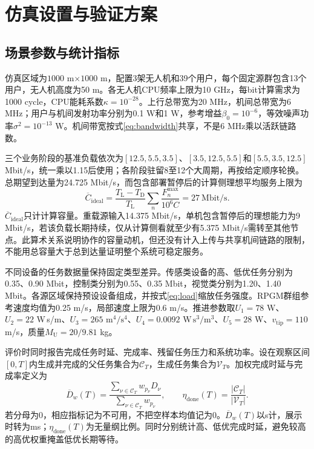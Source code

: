 \section{仿真设置与验证方案}
\subsection{场景参数与统计指标}
仿真区域为$1000$ m$\times1000$ m，配置3架无人机和39个用户，每个固定源群包含13个用户，无人机高度为50 m。各无人机CPU频率上限为10 GHz，每bit计算需求为1000 cycle，CPU能耗系数$\kappa=10^{-28}$。上行总带宽为20 MHz，机间总带宽为6 MHz；用户与机间发射功率分别为0.1 W和1 W，参考增益$\beta_0=10^{-6}$，等效噪声功率$\sigma^2=10^{-13}$ W。机间带宽按式\eqref{eq:bandwidth}共享，不是6 MHz乘以活跃链路数。

三个业务阶段的基准负载依次为$[12.5,5.5,3.5]$、$[3.5,12.5,5.5]$和$[5.5,3.5,12.5]$ Mbit/s，统一乘以1.15后使用；各阶段驻留8至12个大周期，再按给定顺序轮换。总期望到达量为24.725 Mbit/s，而包含部署暂停后的计算侧理想平均服务上限为
\begin{equation}
 \overline C_{\mathrm{ideal}}
 =\frac{T_{\mathrm L}-T_{\mathrm D}}{T_{\mathrm L}}
 \sum_n\frac{F_n^{\max}}{10^6C}
 =27\ \mathrm{Mbit/s}.
 \label{eq:capacity}
\end{equation}
$\overline C_{\mathrm{ideal}}$只计计算容量。重载源输入14.375 Mbit/s，单机包含暂停后的理想能力为9 Mbit/s，若该负载长期持续，仅从计算侧看就至少有5.375 Mbit/s需转至其他节点。此算术关系说明协作的容量动机，但还没有计入上传与共享机间链路的限制，不能用总容量大于总到达量证明整个系统可稳定服务。

不同设备的任务数据量保持固定类型差异。传感类设备的高、低优任务分别为0.35、0.90 Mbit，控制类分别为0.55、0.35 Mbit，视觉类分别为1.20、1.40 Mbit。各源区域保持预设设备组成，并按式\eqref{eq:load}缩放任务强度。RPGM群组参考速度均值为0.25 m/s，局部速度上限为0.6 m/s。推进参数取$U_1=78$ W、$U_2=22$ W\,s/m、$U_3=265$ $\mathrm{m^4/s^4}$、$U_4=0.0092$ $\mathrm{W\,s^3/m^3}$、$U_5=28$ W、$v_{\mathrm{tip}}=110$ m/s，质量$M_{\mathrm U}=20/9.81$ kg。

评价时同时报告完成任务时延、完成率、残留任务压力和系统功率。设在观察区间$[0,T]$内生成并完成的父任务集合为$\mathcal C_T$，生成任务集合为$\mathcal V_T$。加权完成时延与完成率定义为
\begin{equation}
 \overline D_w(T)=
 \frac{\sum_{\nu\in\mathcal C_T}w_{p_\nu}D_\nu}
 {\sum_{\nu\in\mathcal C_T}w_{p_\nu}},
 \qquad
 \eta_{\mathrm{done}}(T)=\frac{|\mathcal C_T|}{|\mathcal V_T|}.
 \label{eq:metrics}
\end{equation}
若分母为0，相应指标记为不可用，不把空样本均值记为0。$\overline D_w(T)$以s计，展示时转为ms；$\eta_{\mathrm{done}}(T)$为无量纲比例。同时分别统计高、低优完成时延，避免较高的高优权重掩盖低优长期等待。

